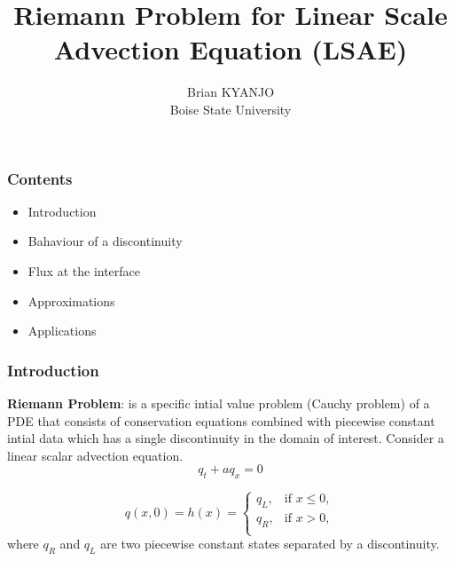 \documentclass[12pt]{beamer}
\begin{document}
	\author{Brian KYANJO \\ Boise State University}
	\title{Riemann Problem for Linear Scale Advection Equation (LSAE)}
	\begin{frame}[plain]
		\maketitle
	\end{frame}
	
	\begin{frame}
		\frametitle{Contents}
		\begin{itemize}
			\item Introduction
			\item Bahaviour of a discontinuity
			\item Flux at the interface
			\item Approximations
			\item Applications
		\end{itemize}
	\end{frame}

\begin{frame}
	\frametitle{Introduction}
    
    	 \textbf{Riemann Problem}: is a specific intial value problem  (Cauchy problem) of a PDE that consists of conservation equations combined with piecewise constant intial data which has a single discontinuity in the domain of interest.
    \pause
    Consider a linear scalar advection equation.
    \begin{equation}
    	q_{t} + a q_{x} = 0
    \end{equation}
	 
	 \begin{equation}
	 	q(x,0) = h(x)  = \begin{cases}
	 		q_{L}, & \text{if $x \le 0,$}\\
	 		q_{R},& \text{if $x > 0,$}\\
	 		
	 	\end{cases}       
	 \end{equation}
 \pause
	where $q_{R}$ and $q_{L}$ are two piecewise constant states separated by a discontinuity.
	\end{frame}
\end{document}
